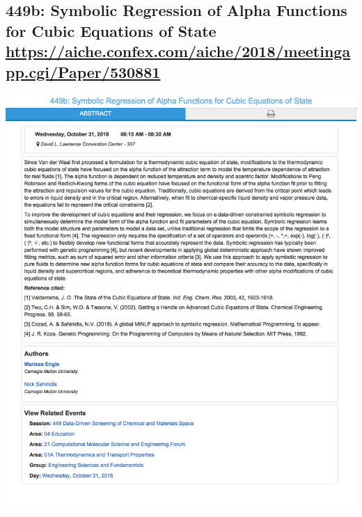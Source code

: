 \documentclass[11pt]{article}
\begin{document}
\subsection{449b: Symbolic Regression of Alpha Functions for Cubic Equations of State \url{https://aiche.confex.com/aiche/2018/meetingapp.cgi/Paper/530881}}
\label{sec:org69a1a73}
\begin{center}
\includegraphics[width=.9\linewidth]{./530881.png}
\end{center}
\end{document}
